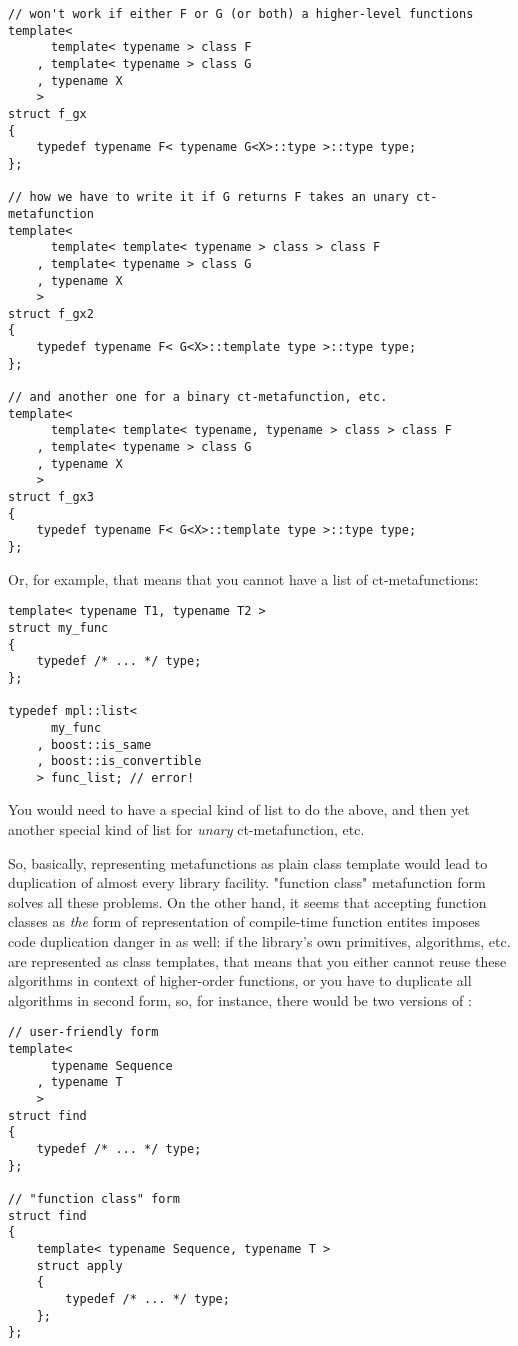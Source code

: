 \documentclass{netobjectdays}
\begin{document}
{\footnotesize
\begin{verbatim}
// won't work if either F or G (or both) a higher-level functions
template<
      template< typename > class F
    , template< typename > class G
    , typename X
    >
struct f_gx
{
    typedef typename F< typename G<X>::type >::type type;
};

// how we have to write it if G returns F takes an unary ct-metafunction
template<
      template< template< typename > class > class F
    , template< typename > class G
    , typename X
    >
struct f_gx2
{
    typedef typename F< G<X>::template type >::type type;
};

// and another one for a binary ct-metafunction, etc.
template<
      template< template< typename, typename > class > class F
    , template< typename > class G
    , typename X
    >
struct f_gx3
{
    typedef typename F< G<X>::template type >::type type;
};
\end{verbatim}
}

Or, for example, that means that you cannot have a list of 
ct-metafunctions:

{\footnotesize
\begin{verbatim}
template< typename T1, typename T2 >
struct my_func
{
    typedef /* ... */ type;
};

typedef mpl::list< 
      my_func
    , boost::is_same
    , boost::is_convertible
    > func_list; // error!
\end{verbatim}
}

You would need to have a special kind of list to do the above, 
and then yet another special kind of list for \emph{unary} 
ct-metafunction, etc.

So, basically, representing metafunctions as plain class 
template would lead to duplication of almost every library 
facility. "function class" metafunction form solves all these 
problems. On the other hand, it seems that accepting function 
classes as \emph{the} form of representation of compile-time 
function entites imposes code duplication danger in as well: 
if the library's own primitives, algorithms, etc. are 
represented as class templates, that means that you either 
cannot reuse these algorithms in context of higher-order 
functions, or you have to duplicate all algorithms in second 
form, so, for instance, there would be two versions of 
:

{\footnotesize
\begin{verbatim}
// user-friendly form
template<
      typename Sequence
    , typename T
    >
struct find
{
    typedef /* ... */ type;
};

// "function class" form
struct find
{
    template< typename Sequence, typename T >
    struct apply
    {
        typedef /* ... */ type;
    };
};
\end{verbatim}
}
\end{document}
